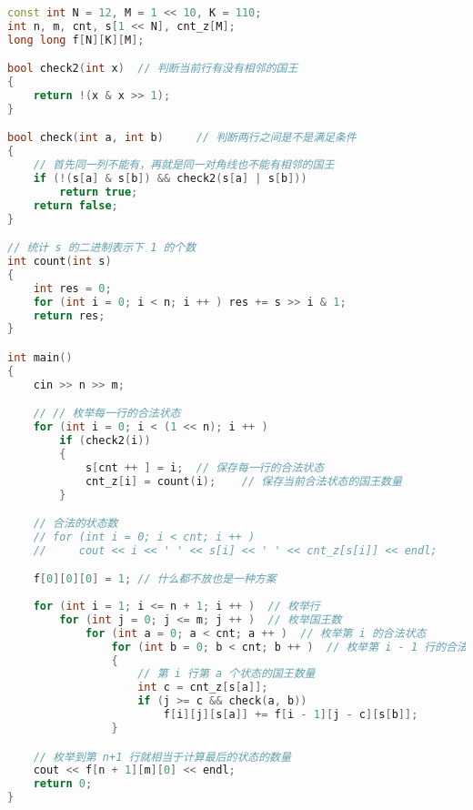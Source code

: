 \begin{lstlisting}[language=cpp]
const int N = 12, M = 1 << 10, K = 110;
int n, m, cnt, s[1 << N], cnt_z[M];
long long f[N][K][M];

bool check2(int x)  // 判断当前行有没有相邻的国王
{
    return !(x & x >> 1);
}

bool check(int a, int b)     // 判断两行之间是不是满足条件
{
    // 首先同一列不能有，再就是同一对角线也不能有相邻的国王
    if (!(s[a] & s[b]) && check2(s[a] | s[b]))
        return true;
    return false;
}

// 统计 s 的二进制表示下 1 的个数
int count(int s)
{
    int res = 0;
    for (int i = 0; i < n; i ++ ) res += s >> i & 1;
    return res;
}

int main()
{
    cin >> n >> m;

    // // 枚举每一行的合法状态
    for (int i = 0; i < (1 << n); i ++ )    
        if (check2(i))
        {
            s[cnt ++ ] = i;  // 保存每一行的合法状态
            cnt_z[i] = count(i);    // 保存当前合法状态的国王数量
        }

    // 合法的状态数
    // for (int i = 0; i < cnt; i ++ )
    //     cout << i << ' ' << s[i] << ' ' << cnt_z[s[i]] << endl;

    f[0][0][0] = 1; // 什么都不放也是一种方案
    
    for (int i = 1; i <= n + 1; i ++ )  // 枚举行
        for (int j = 0; j <= m; j ++ )  // 枚举国王数
            for (int a = 0; a < cnt; a ++ )  // 枚举第 i 的合法状态
                for (int b = 0; b < cnt; b ++ )  // 枚举第 i - 1 行的合法状态
                {
                    // 第 i 行第 a 个状态的国王数量
                    int c = cnt_z[s[a]];
                    if (j >= c && check(a, b)) 
                        f[i][j][s[a]] += f[i - 1][j - c][s[b]];
                }

    // 枚举到第 n+1 行就相当于计算最后的状态的数量
    cout << f[n + 1][m][0] << endl;
    return 0;
}
\end{lstlisting}